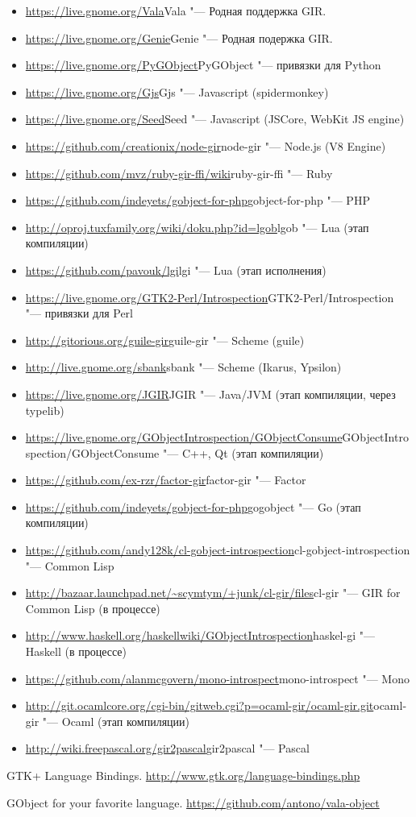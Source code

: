 \documentclass[10pt, a5paper]{article}
\begin{document}
\begin{itemize}
  \item \url{https://live.gnome.org/Vala}{Vala} "--- Родная поддержка GIR.
  \item \url{https://live.gnome.org/Genie}{Genie} "--- Родная подержка GIR.
  \item \url{https://live.gnome.org/PyGObject}{PyGObject} "--- привязки для Python
  \item \url{https://live.gnome.org/Gjs}{Gjs} "--- Javascript (spidermonkey)
  \item \url{https://live.gnome.org/Seed}{Seed} "--- Javascript (JSCore, WebKit JS engine)
  \item \url{https://github.com/creationix/node-gir}{node-gir} "--- Node.js (V8 Engine)
  \item \url{https://github.com/mvz/ruby-gir-ffi/wiki}{ruby-gir-ffi} "--- Ruby
  \item \url{https://github.com/indeyets/gobject-for-php}{gobject-for-php} "--- PHP
  \item \url{http://oproj.tuxfamily.org/wiki/doku.php?id=lgob}{lgob} "--- Lua (этап компиляции)
  \item \url{https://github.com/pavouk/lgi}{lgi} "--- Lua (этап исполнения)
  \item \url{https://live.gnome.org/GTK2-Perl/Introspection}{GTK2-Perl/Introspection} "--- привязки для Perl
  \item \url{http://gitorious.org/guile-gir}{guile-gir} "--- Scheme (guile)
  \item \url{http://live.gnome.org/sbank}{sbank} "--- Scheme (Ikarus, Ypsilon)
  \item \url{https://live.gnome.org/JGIR}{JGIR} "--- Java/JVM (этап компиляции, через typelib)
  \item \url{https://live.gnome.org/GObjectIntrospection/GObjectConsume}{GObjectIntrospection/GObjectConsume} "--- C++, Qt (этап компиляции)
  \item \url{https://github.com/ex-rzr/factor-gir}{factor-gir} "--- Factor
  \item \url{https://github.com/indeyets/gobject-for-php}{gogobject} "--- Go (этап компиляции)
  \item \url{https://github.com/andy128k/cl-gobject-introspection}{cl-gobject-introspection} "--- Common Lisp
  \item \url{http://bazaar.launchpad.net/~scymtym/+junk/cl-gir/files}{cl-gir} "--- GIR for Common Lisp (в процессе)
  \item \url{http://www.haskell.org/haskellwiki/GObjectIntrospection}{haskel-gi} "--- Haskell (в процессе)
  \item \url{https://github.com/alanmcgovern/mono-introspect}{mono-introspect} "--- Mono
  \item \url{http://git.ocamlcore.org/cgi-bin/gitweb.cgi?p=ocaml-gir/ocaml-gir.git}{ocaml-gir} "--- Ocaml (этап компиляции)
  \item \url{http://wiki.freepascal.org/gir2pascal}{gir2pascal} "--- Pascal
\end{itemize}



\begin{thebibliography}{9}

 GTK+ Language Bindings. \url{http://www.gtk.org/language-bindings.php}

 GObject for your favorite language. \url{https://github.com/antono/vala-object}

\end{thebibliography}
\end{document}
